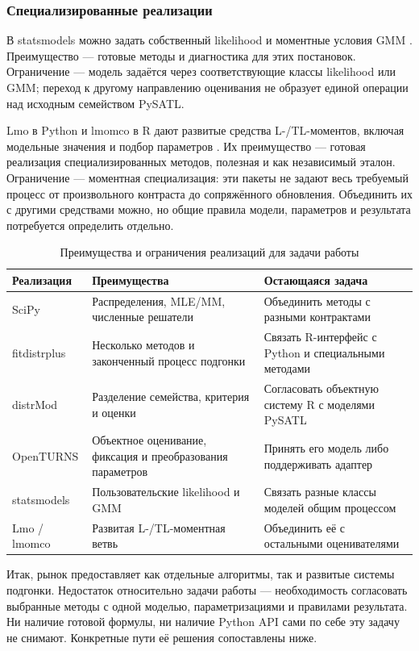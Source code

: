 \subsubsection{Специализированные реализации}
В statsmodels можно задать собственный likelihood и моментные условия
GMM \cite{reviewStatsmodelsLikelihood,reviewStatsmodelsGMM}.
Преимущество --- готовые методы и диагностика для этих постановок.
Ограничение --- модель задаётся через соответствующие классы likelihood
или GMM; переход к другому направлению оценивания не образует
единой операции над исходным семейством PySATL.

Lmo в Python и lmomco в R дают развитые средства L-/TL-моментов,
включая модельные значения и подбор параметров
\cite{reviewLmo,reviewLmomco}. Их преимущество --- готовая реализация
специализированных методов, полезная и как независимый эталон.
Ограничение --- моментная специализация: эти пакеты не задают весь
требуемый процесс от произвольного контраста до сопряжённого обновления.
Объединить их с другими средствами можно, но общие правила модели,
параметров и результата потребуется определить отдельно.

\begin{table}[htbp]
\centering\small
\caption{Преимущества и ограничения реализаций для задачи работы}
\label{tab:review-tools}
\begin{tabularx}{\textwidth}{@{}p{}XX@{}}
\toprule
Реализация & Преимущества & Остающаяся задача \\
\midrule
SciPy & Распределения, MLE/MM, численные решатели & Объединить методы с разными контрактами \\
fitdistrplus & Несколько методов и законченный процесс подгонки & Связать R-интерфейс с Python и специальными методами \\
distrMod & Разделение семейства, критерия и оценки & Согласовать объектную систему R с моделями PySATL \\
OpenTURNS & Объектное оценивание, фиксация и преобразования параметров & Принять его модель либо поддерживать адаптер \\
statsmodels & Пользовательские likelihood и GMM & Связать разные классы моделей общим процессом \\
Lmo / lmomco & Развитая L-/TL-моментная ветвь & Объединить её с остальными оценивателями \\
\bottomrule
\end{tabularx}
\end{table}

Итак, рынок предоставляет как отдельные алгоритмы, так и развитые
системы подгонки. Недостаток относительно задачи работы --- необходимость
согласовать выбранные методы с одной моделью, параметризациями и
правилами результата. Ни наличие готовой формулы, ни наличие Python API
сами по себе эту задачу не снимают. Конкретные пути её решения
сопоставлены ниже.

